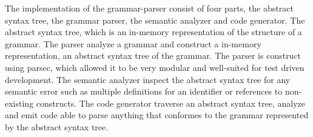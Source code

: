 The implementation of the grammar-parser consist of four parts, the abstract syntax tree, the grammar parser, the semantic analyzer and code generator.
The abstract syntax tree, which is an in-memory representation of the structure of a grammar.
 The parser analyze a grammar and construct a in-memory representation, an abstract syntax tree of the grammar.  The parser is construct using parsec, which allowed it to be very modular and well-suited for test driven development.
The semantic analyzer inspect the abstract syntax tree for any semantic error such as multiple definitions for an identifier or references to non-existing constructs. The code generator traverse an abstract syntax tree, analyze and emit code able to parse anything that conformes to the grammar represented by the abstract syntax tree.
